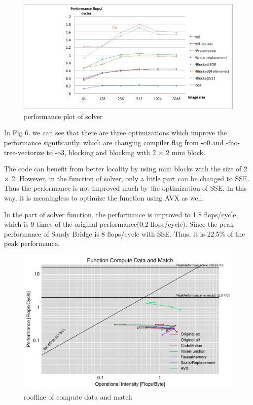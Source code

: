 \documentclass[letterpaper]{article}
\begin{document}
\begin{figure}[H]\centering
  \includegraphics[scale=0.3]{solver.pdf}
  \caption{performance plot of solver}
\end{figure}

In Fig 6. we can see that there are three optimizations which improve the performance significantly, which are changing compiler flag from -o0 and -fno-tree-vectorize to -o3, blocking and blocking with 2 $\times$ 2 mini block.

The code can benefit from better locality by using mini blocks with the size of 2 $\times$ 2. However, in the function of solver, only a little part can be changed to SSE. Thus the performance is not improved much by the optimization of SSE.
In this way, it is meaningless to optimize the function using AVX as well.

In the part of solver function, the performance is improved to 1.8 flops/cycle, which is 9 times of the original performance(0.2 flops/cycle).
Since the peak performance of Sandy Bridge is 8 flops/cycle with SSE. Thus, it is 22.5\% of the peak performance.

\begin{figure}[H]\centering
  \includegraphics[scale=0.45]{roofline_compute.pdf}
  \caption{roofline of compute data and match}
\end{figure}
\end{document}
